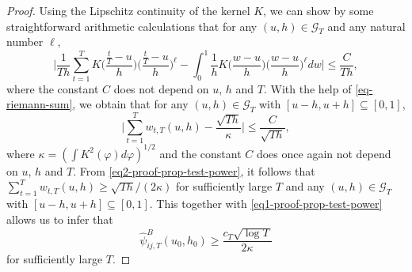 \begin{proof}
Using the Lipschitz continuity of the kernel $K$, we can show by some straightforward arithmetic calculations that for any $(u,h) \in \mathcal{G}_T$ and any natural number $\ell$, 
\begin{equation}\label{eq-riemann-sum}
\Big| \frac{1}{Th} \sum\limits_{t=1}^T K\Big(\frac{\frac{t}{T}-u}{h}\Big) \Big(\frac{\frac{t}{T}-u}{h}\Big)^\ell - \int_0^1 \frac{1}{h} K\Big(\frac{w-u}{h}\Big) \Big(\frac{w-u}{h}\Big)^\ell dw \Big| \le \frac{C}{Th}, 
\end{equation}
where the constant $C$ does not depend on $u$, $h$ and $T$. With the help of \eqref{eq-riemann-sum}, we obtain that for any $(u,h) \in \mathcal{G}_T$ with $[u-h,u+h] \subseteq [0,1]$, 
\begin{equation}\label{eq2-proof-prop-test-power}
\Big| \sum\limits_{t=1}^T w_{t,T}(u,h) - \frac{\sqrt{Th}}{\kappa} \Big| \le \frac{C}{\sqrt{Th}}, 
\end{equation}
where $\kappa = (\int K^2(\varphi)d\varphi)^{1/2}$ and the constant $C$ does once again not depend on $u$, $h$ and $T$. From \eqref{eq2-proof-prop-test-power}, it follows that $\sum\nolimits_{t=1}^T w_{t,T}(u,h) \ge \sqrt{Th} / (2\kappa)$ for sufficiently large $T$ and any $(u,h) \in \mathcal{G}_T$ with $[u-h,u+h] \subseteq [0,1]$. This together with \eqref{eq1-proof-prop-test-power} allows us to infer that 
\begin{equation}\label{eqA:power:psiB}
\widehat{\psi}_{ij, T}^B(u_0,h_0) \ge \frac{c_T \sqrt{\log T}}{2 \kappa} 
\end{equation}
for sufficiently large $T$. 


\end{proof}
